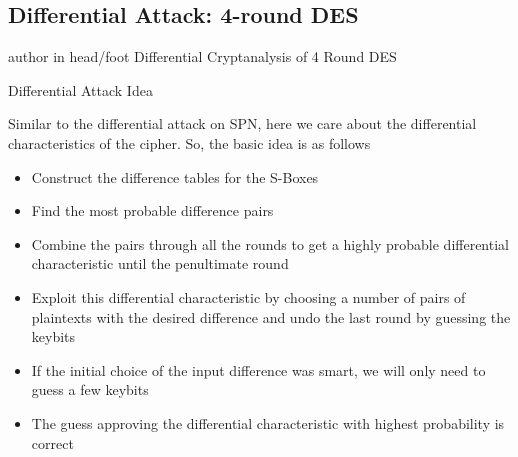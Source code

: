 \documentclass[9pt]{beamer}
\begin{document}
\subsection{Differential Attack: 4-round DES}
\begin{frame}
\begin{beamercolorbox}[ht=2.5ex,dp=1.125ex,center,rounded=true,shadow=true]{author in head/foot}
Differential Cryptanalysis of 4 Round DES
\end{beamercolorbox}
\end{frame}

\begin{frame}
Differential Attack Idea

\vspace{5mm}
Similar to the differential attack on SPN, here we care about the differential characteristics of the cipher. \pause So, the basic idea is as follows

\begin{itemize}[<+->]
\item{Construct the difference tables for the S-Boxes}
\item{Find the most probable difference pairs}
\item{Combine the pairs through all the rounds to get a highly probable differential characteristic until the penultimate round}
\item{Exploit this differential characteristic by choosing a number of pairs of plaintexts with the desired difference and undo the last round by guessing the keybits}
\item{If the initial choice of the input difference was smart, we will only need to guess a few keybits}
\item{The guess approving the differential characteristic with highest probability is correct}
\end{itemize}

\end{frame}
\end{document}
